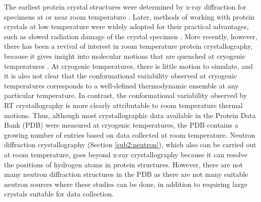\documentclass[9pt,review]{livecoms}
\begin{document}
The earliest protein crystal structures were determined by x-ray diffraction for specimens at or near room temperature \cite{muirhead_structure_1963}.
Later, methods of working with protein crystals at low temperature were widely adopted for their practical advantages, such as slowed radiation damage of the crystal specimen \cite{fischer_macromolecular_2021,thorne_determining_2023}.
More recently, however, there has been a revival of interest in room temperature protein crystallography, because it gives insight into molecular motions that are quenched at cryogenic temperatures \cite{fraser_hidden_2009,keedy_crystal_2014,fischer_macromolecular_2021,thorne_determining_2023}.
At cryogenic temperatures, there is little motion to simulate, and it is also not clear that the conformational variability observed at cryogenic temperatures corresponds to a well-defined thermodynamic ensemble at any particular temperature.
In contrast, the conformational variability observed by RT crystallography is more clearly attributable to room temperature thermal motions.
Thus, although most crystallographic data available in the Protein Data Bank (PDB) were measured at cryogenic temperatures, the PDB contains a growing number of entries based on data collected at room temperature.
Neutron diffraction crystallography (Section \ref{sub2:neutron}), which also can be carried out at room temperature, goes beyond x-ray crystallography because it can resolve the positions of hydrogen atoms in protein structures.
However, there are not many neutron diffraction structures in the PDB as there are not many suitable neutron sources where these studies can be done, in addition to requiring large crystals suitable for data collection.
\end{document}
